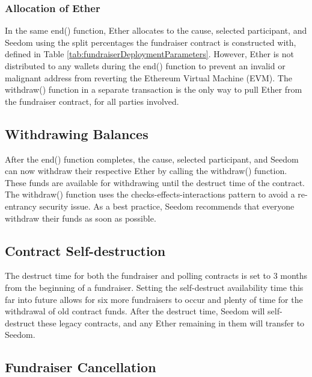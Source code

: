 \documentclass[11pt]{article}
\begin{document}
\subsubsection{Allocation of Ether}

In the same end() function, Ether allocates to the cause, selected participant, and Seedom using the split percentages the fundraiser contract is constructed with, defined in Table \ref{tab:fundraiserDeploymentParameters}. However, Ether is not distributed to any wallets during the end() function to prevent an invalid or malignant address from reverting the Ethereum Virtual Machine (EVM). The withdraw() function in a separate transaction is the only way to pull Ether from the fundraiser contract, for all parties involved.

\subsection{Withdrawing Balances}

After the end() function completes, the cause, selected participant, and Seedom can now withdraw their respective Ether by calling the withdraw() function. These funds are available for withdrawing until the destruct time of the contract. The withdraw() function uses the checks-effects-interactions pattern \cite{7} to avoid a re-entrancy security issue. As a best practice, Seedom recommends that everyone withdraw their funds as soon as possible.

\subsection{Contract Self-destruction}
\label{sec:contractSelfDestruction}

The destruct time for both the fundraiser and polling contracts is set to 3 months from the beginning of a fundraiser. Setting the self-destruct availability time this far into future allows for six more fundraisers to occur and plenty of time for the withdrawal of old contract funds. After the destruct time, Seedom will self-destruct these legacy contracts, and any Ether remaining in them will transfer to Seedom.

\subsection{Fundraiser Cancellation}
\label{sec:fundraiserCancellation}
\end{document}
